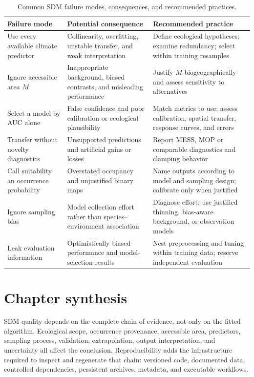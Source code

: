 \begin{table}[H]
\centering
\caption{Common SDM failure modes, consequences, and recommended practices.}
\label{tab:erros_comuns_sdm}
\scriptsize
\setlength{\tabcolsep}{3pt}
\begin{tabular}{p{}p{}p{}}
\toprule
\textbf{Failure mode} & \textbf{Potential consequence} & \textbf{Recommended practice} \\
\midrule
Use every available climate predictor & Collinearity, overfitting, unstable transfer, and weak interpretation & Define ecological hypotheses; examine redundancy; select within training resamples \\
Ignore accessible area \(M\) & Inappropriate background, biased contrasts, and misleading performance & Justify \(M\) biogeographically and assess sensitivity to alternatives \\
Select a model by AUC alone & False confidence and poor calibration or ecological plausibility & Match metrics to use; assess calibration, spatial transfer, response curves, and errors \\
Transfer without novelty diagnostics & Unsupported predictions and artificial gains or losses & Report MESS, MOP or comparable diagnostics and clamping behavior \\
Call suitability an occurrence probability & Overstated occupancy and unjustified binary maps & Name outputs according to model and sampling design; calibrate only when justified \\
Ignore sampling bias & Model collection effort rather than species--environment association & Diagnose effort; use justified thinning, bias-aware background, or observation models \\
Leak evaluation information & Optimistically biased performance and model-selection results & Nest preprocessing and tuning within training data; reserve independent evaluation \\
\bottomrule
\end{tabular}
\end{table}

\section{Chapter synthesis}

SDM quality depends on the complete chain of evidence, not only on the fitted algorithm. Ecological scope, occurrence provenance, accessible area, predictors, sampling process, validation, extrapolation, output interpretation, and uncertainty all affect the conclusion. Reproducibility adds the infrastructure required to inspect and regenerate that chain: versioned code, documented data, controlled dependencies, persistent archives, metadata, and executable workflows.


